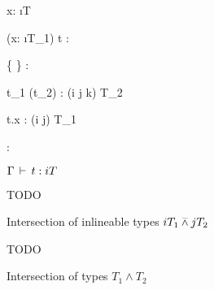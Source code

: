 \documentclass[paper.tex]{subfiles}
\begin{document}
\begin{figure}[H]
  {\Gamma \ts x: \i{T}}

  {\Gamma \ts (x: \i{T_1}) \ra t : }

  {\Gamma \ts \{  \} : }

  {\Gamma \ts t_1 (t_2) : (i \barwedge j \barwedge k) T_2}

  {\Gamma \ts t.x : (i \barwedge j) T_1}

  {\Gamma \ts {}: }
  
  \caption{$\Gamma \,\vdash\, t: i T$}
\end{figure}

\begin{figure}[H]
  TODO
  \caption{Intersection of inlineable types $i T_1 \barwedge j T_2$}
\end{figure}

\begin{figure}[H]
  TODO
  \caption{Intersection of types ${T_1} \wedge {T_2}$}
\end{figure}
\end{document}
